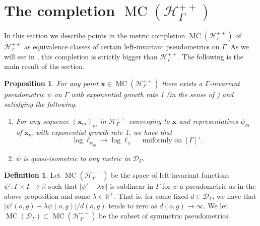 \documentclass[twoside]{amsart}
\newtheorem{proposition}[theorem]{Proposition}
\theoremstyle{definition}
\newtheorem{definition}[theorem]{Definition}
\numberwithin{equation}{section}
\numberwithin{theorem}{section}
\newcommand{\R}{\mathbb{R}}
\newcommand{\calC}{\mathcal{C}}
\newcommand{\calD}{\mathcal{D}}
\newcommand{\calH}{\mathcal{H}}
\newcommand{\scrH}{\mathscr{H}}
\newcommand{\G}{\Gamma}
\newcommand{\lam}{\lambda}
\newcommand{\p}{\psi}
\newcommand{\ra}{\rightarrow}
\newcommand{\vx}{\mathbf{x}}
\DeclareMathOperator{\MC}{MC}
\begin{document}









\section{The completion $\MC(\scrH_\G^{++})$}\label{sec:metriccompletion}

In this section we describe points in the metric completion $\MC(\scrH_\G^{++})$ of $\scrH_\G^{++}$ as equivalence classes of certain left-invariant pseudometrics on $\G$. As we will see in , this completion is strictly bigger than $\scrH_\G^{++}$. The following is the main result of the section.

\begin{proposition}\label{prop:MC(H)}
For any point $\vx\in \MC(\scrH_\G^{++})$ there exists a $\G$-invariant pseudometric $\p$ on $\G$ with exponential growth rate 1 (in the sense of ) and satisfying the following.
\begin{enumerate}
    \item For any sequence $(\vx_m)_m$ in $\scrH_\G^{++}$ converging to $\vx$ and representatives $\p_m$ of $\vx_m$ with exponential growth rate 1, we have that 
    $$\log \ell_{\p_m} \to\log \ell_{\p} \quad  \text{ uniformly on }[\G]'.$$
    \item $\p$ is quasi-isometric to any metric in $\calD_\G$. 
\end{enumerate}  
\end{proposition}

\begin{definition}\label{def:MCHandD}
Let $\MC(\calH_\G^{++})$ be the space of left-invariant functions $\p':\G\times \G \ra \R$ such that $|\p'-\lam \p|$ is sublinear in $\G$ for $\p$ a pseudometric as in the above proposition and some $\lam\in \R^+$. That is, for some fixed $d\in \calD_\G$, we have that $|\p'(o,g)-\lam \p(o,g)|/d(o,g)$ tends to zero as $d(o,g) \to \infty$. We let $\MC(\calD_\G)\subset \MC(\calH_\G^{++})$ be the subset of symmetric pseudometrics. 
\end{definition}
\end{document}
